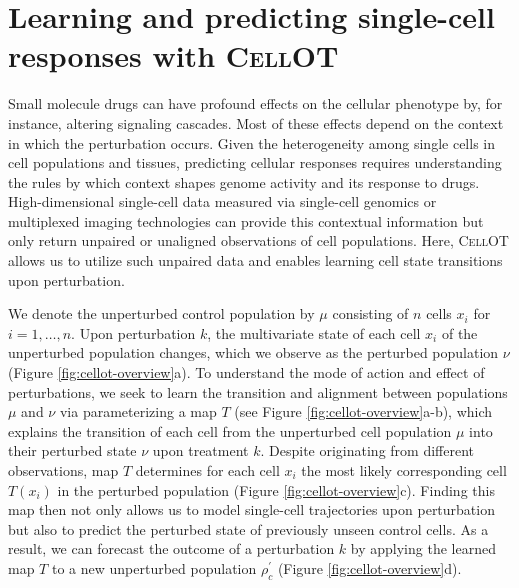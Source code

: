 \section{Learning and predicting single-cell responses with \textsc{CellOT}}

Small molecule drugs can have profound effects on the cellular phenotype by, for instance, altering signaling cascades.
Most of these effects depend on the context in which the perturbation occurs.
Given the heterogeneity among single cells in cell populations and tissues, predicting cellular responses requires understanding the rules by which context shapes genome activity and its response to drugs.
High-dimensional single-cell data measured via single-cell genomics or multiplexed imaging technologies can provide this contextual information but only return  unpaired or unaligned observations of cell populations.
Here, \textsc{CellOT} allows us to utilize such unpaired data and enables learning cell state transitions upon perturbation.

We denote the unperturbed control population by $\mu$ consisting of $n$ cells $x_i$ for $i = 1, \dots, n$.
Upon perturbation $k$, the multivariate state of each cell $x_i$ of the unperturbed population changes, which we observe as the perturbed population $\nu$ (Figure \ref{fig:cellot-overview}a).
To understand the mode of action and effect of perturbations, we seek to learn the transition and alignment between populations $\mu$ and $\nu$ via parameterizing a map $T$ (see Figure \ref{fig:cellot-overview}a-b), which explains the transition of each cell from the unperturbed cell population $\mu$ into their perturbed state $\nu$ upon treatment $k$.
Despite originating from  different observations, map $T$ determines for each cell $x_i$ the most likely corresponding cell $T(x_i)$ in the perturbed population (Figure \ref{fig:cellot-overview}c).
Finding this map then not only allows us to model single-cell trajectories upon perturbation but also to predict the perturbed state of previously unseen control cells.
As a result, we can forecast the outcome of a perturbation $k$  by applying the learned map $T$ to a new unperturbed population $\rho^\prime_c$ (Figure \ref{fig:cellot-overview}d).

